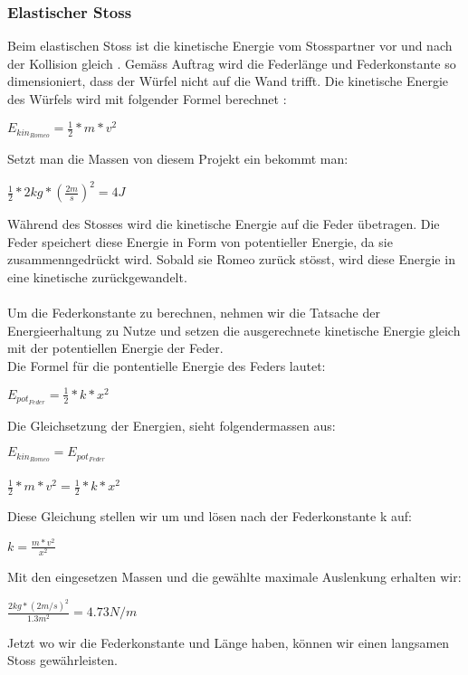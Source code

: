 \documentclass[../main.tex]{subfiles}
\begin{document}
\subsubsection{Elastischer Stoss}
Beim elastischen Stoss ist die kinetische Energie vom Stosspartner vor und nach der Kollision gleich \cite{tiplerpaula.PhysikFurStudierende}. Gemäss Auftrag wird die Federlänge und Federkonstante so dimensioniert, dass der Würfel nicht auf die Wand trifft.
Die kinetische Energie des Würfels wird mit folgender Formel berechnet \cite{tiplerpaula.PhysikFurStudierende}:
\begin{mdframed}
$E_{kin_{Romeo}}=\frac{1}{2} * m * v^{2}$
\end{mdframed}
Setzt man die Massen von diesem Projekt ein bekommt man:
\begin{mdframed}
$\frac{1}{2} * 2kg * (\frac{2m}{s})^{2} = 4J$
\end{mdframed}
Während des Stosses wird die kinetische Energie auf die Feder übetragen. Die Feder speichert diese Energie in Form von potentieller Energie, da sie zusammenngedrückt wird. Sobald sie Romeo zurück stösst, wird diese Energie in eine kinetische zurückgewandelt.\\\\
Um die Federkonstante zu berechnen, nehmen wir die Tatsache der Energieerhaltung zu Nutze und setzen die ausgerechnete kinetische Energie gleich mit der potentiellen Energie der Feder.\\
Die Formel für die pontentielle Energie des Feders lautet\cite{tiplerpaula.PhysikFurStudierende}:
\begin{mdframed}
$E_{pot_{Feder}}=\frac{1}{2} * k * x^{2}$
\end{mdframed}
Die Gleichsetzung der Energien, sieht folgendermassen aus\cite{tiplerpaula.PhysikFurStudierende}:
\begin{mdframed}
$E_{kin_{Romeo}}=E_{pot_{Feder}}$\\\\
$\frac{1}{2} * m * v^{2} = \frac{1}{2} * k * x^{2}$
\end{mdframed}
Diese Gleichung stellen wir um und lösen nach der Federkonstante k auf:
\begin{mdframed}
$ k=\frac{m * v^{2}}{x^{2}}$
\end{mdframed}
Mit den eingesetzen Massen und die gewählte maximale Auslenkung erhalten wir:
\begin{mdframed}
$\frac{2kg*(2m/s)^{2}}{1.3m^{2}} = 4.73N/m$
\end{mdframed}
Jetzt wo wir die Federkonstante und Länge haben, können wir einen langsamen Stoss gewährleisten.
\newpage
\end{document}
